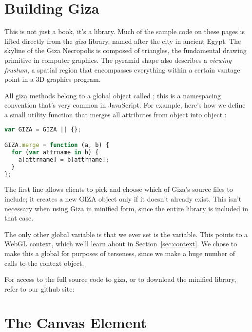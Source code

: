 \section{Building Giza}

This is not just a book, it's a library.  Much of the sample code on these pages is lifted directly from the \emph{giza} library, named after the city in ancient Egypt.  The skyline of the Giza Necropolis is composed of triangles, the fundamental drawing primitive in computer graphics.  The pyramid shape also describes a \emph{viewing frustum}, a spatial region that encompasses everything within a certain vantage point in a 3D graphics program.

All giza methods belong to a global object called ; this is a namespacing convention that's very common in JavaScript.  For example, here's how we define a small utility function that merges all attributes from object  into object :

\begin{lstlisting}[language=JavaScript]
var GIZA = GIZA || {};

GIZA.merge = function (a, b) {
  for (var attrname in b) {
    a[attrname] = b[attrname];
  }
};
\end{lstlisting}

The first line allows clients to pick and choose which of Giza's source files to include; it creates a new GIZA object only if it doesn't already exist.  This isn't necessary when using Giza in minified form, since the entire library is included in that case.

The only other global variable is that we ever set is the  variable.  This points to a WebGL context, which we'll learn about in Section~\ref{sec:context}.  We chose to make this a global for purposes of terseness, since we make a huge number of calls to the context object.

For access to the full source code to giza, or to download the minified library, refer to our github site:


\section{The Canvas Element}

